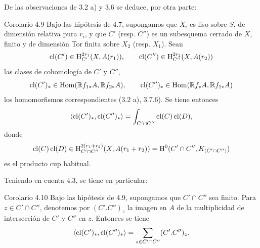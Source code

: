 De las observaciones de 3.2 a) y 3.6 se deduce, por otra parte:

\begin{statement}{Corolario 4.9}
Bajo las hipótesis de 4.7, supongamos que $X_i$ es liso sobre $S$, de dimensión relativa pura $r_i$, y que $C'$ (resp. $C''$) es un subesquema cerrado de $X$, finito y de dimensión Tor finita sobre $X_2$ (resp. $X_1$). Sean
\[
\operatorname{cl}(C')\in \mathrm{H}_{C'}^{2r_1}(X,A(r_1)),\qquad
\operatorname{cl}(C'')\in \mathrm{H}_{C''}^{2r_2}(X,A(r_2))
\]
las clases de cohomología de $C'$ y $C''$,
\[
\operatorname{cl}(C')_*\in\operatorname{Hom}(\mathbb{R} f_{1*}A,\mathbb{R} f_{2*}A),\qquad
\operatorname{cl}(C'')_*\in\operatorname{Hom}(\mathbb{R} f_*A,\mathbb{R} f_{1*}A)
\]
los homomorfismos correspondientes (3.2 a), 3.7.6). Se tiene entonces
\[
\langle \operatorname{cl}(C')_*,\operatorname{cl}(C'')_*\rangle
=
\int_{C'\cap C''}\operatorname{cl}(C)\operatorname{cl}(D),
\]
donde
\[
\operatorname{cl}(C)\operatorname{cl}(D)\in
\mathrm{H}_{C'\cap C''}^{2(r_1+r_2)}(X,A(r_1+r_2))
=
\mathrm{H}^0(C'\cap C'',K_{(C'\cap C'')})
\]
es el producto cup habitual.
\end{statement}

Teniendo en cuenta 4.3, se tiene en particular:

\begin{statement}{Corolario 4.10}
Bajo las hipótesis de 4.9, supongamos que $C'\cap C''$ sea finito. Para $z\in C'\cap C''$, denotemos por $(C'.C'')_z$ la imagen en $A$ de la multiplicidad de intersección de $C'$ y $C''$ en $z$. Entonces se tiene
\[
\langle \operatorname{cl}(C')_*,\operatorname{cl}(C'')_*\rangle
=
\sum_{z\in C'\cap C''}(C'.C'')_z.
\]
\end{statement}

